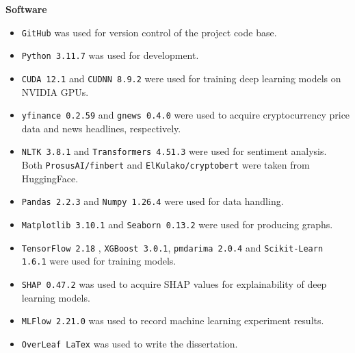 \documentclass[ %
                    author={Raj Dhakan},
                supervisor={Dr. Ayush Joshi},
                    degree={MSc},
                     title={Ethereum Price Prediction using Internal and External Factors},
                  subtitle={},
                      type={},
                      year={2025}]{dissertation}
\begin{document}
\noindent \textbf{Software}
\begin{itemize}
    \item \texttt{GitHub} was used for version control of the project code base.
    \item \texttt{Python 3.11.7} was used for development.
    \item \texttt{CUDA 12.1} and \texttt{CUDNN 8.9.2} were used for training deep learning models on NVIDIA GPUs.
    \item \texttt{yfinance 0.2.59} and \texttt{gnews 0.4.0} were used to acquire cryptocurrency price data and news headlines, respectively.
    \item \texttt{NLTK 3.8.1} and \texttt{Transformers 4.51.3} were used for sentiment analysis. Both \texttt{ProsusAI/finbert} and \texttt{ElKulako/cryptobert} were taken from HuggingFace.
    \item \texttt{Pandas 2.2.3} and \texttt{Numpy 1.26.4} were used for data handling. 
    \item \texttt{Matplotlib 3.10.1} and \texttt{Seaborn 0.13.2} were used for producing graphs.
    \item \texttt{TensorFlow 2.18} , \texttt{XGBoost 3.0.1}, \texttt{pmdarima 2.0.4} and \texttt{Scikit-Learn 1.6.1} were used for training models. 
    \item \texttt{SHAP 0.47.2} was used to acquire SHAP values for explainability of deep learning models.
    \item \texttt{MLFlow 2.21.0} was used to record machine learning experiment results.
    \item \texttt{OverLeaf LaTex} was used to write the dissertation.
\end{itemize}



%

\mainmatter
\end{document}
